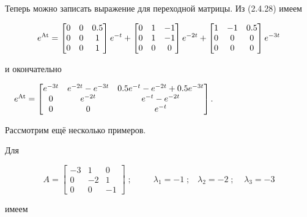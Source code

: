 		Теперь можно записать выражение для переходной матрицы. Из (2.4.28) имеем


\begin{equation*}
e^{\normalsubformula{\text{At}}}=\left[\begin{matrix}0&0&0.5\\0&0&1\\0&0&1\end{matrix}\right]e^{-t}+\left[\begin{matrix}0&1&-1\\0&1&-1\\0&0&0\end{matrix}\right]e^{-2t}+\left[\begin{matrix}1&-1&0.5\\0&0&0\\0&0&0\end{matrix}\right]e^{-3t}
\end{equation*}

		и окончательно



		\ \ 
		$e^{\normalsubformula{\text{At}}}=\left[\begin{matrix}e^{-3t}&e^{-2t}-e^{-3t}&0.5e^{-t}-e^{-2t}+0.5e^{-3t}\\0&e^{-2t}&e^{-t}-e^{-2t}\\0&0&e^{-t}\end{matrix}\right]$.



		Рассмотрим ещё несколько примеров.



		Для


\begin{equation*}
A=\left[\begin{matrix}-3&1&0\\0&-2&1\\0&0&-1\end{matrix}\right]\;;\;\;\;\;\;\;\;\;\;\lambda _1=-1\;;\;\;\;\lambda _2=-2\;;\;\;\;\;\lambda _3=-3
\end{equation*}

		имеем


